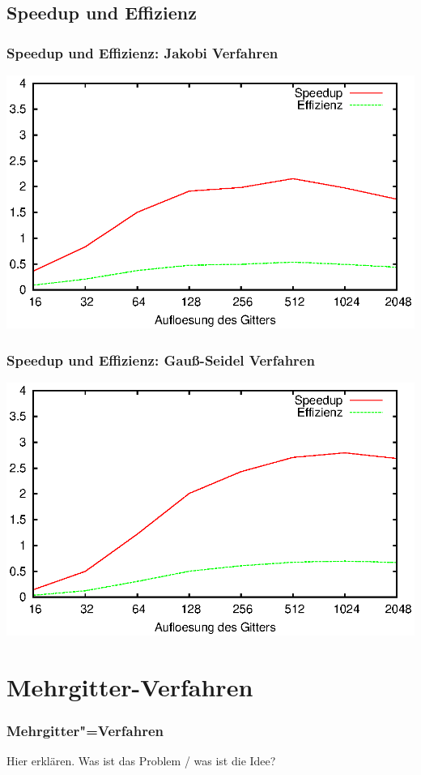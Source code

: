 \documentclass{beamer}
\begin{document}
\subsection{Speedup und Effizienz}
\begin{frame}
    \frametitle{Speedup und Effizienz: Jakobi Verfahren}
    \includegraphics[width=\textwidth]{benchmarkjakobi}
\end{frame}

\begin{frame}
    \frametitle{Speedup und Effizienz: Gauß-Seidel Verfahren}
    \includegraphics[width=\textwidth]{benchmarkgaussseidel}
\end{frame}

\section{Mehrgitter-Verfahren}
\begin{frame}
    \frametitle{Mehrgitter"=Verfahren}
    Hier erklären. Was ist das Problem / was ist die Idee?
\end{frame}
\end{document}
